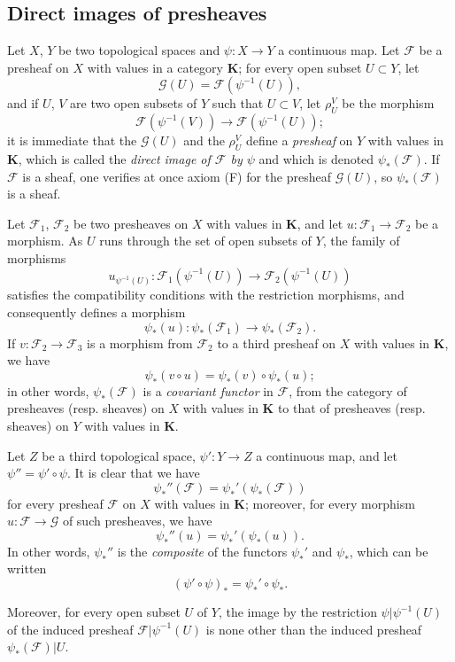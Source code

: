 \subsection{Direct images of presheaves}
\label{subsection:0.3.4}

\begin{env}[3.4.1]
\label{0.3.4.1}
Let $X$, $Y$ be two topological spaces and $\psi:X\to Y$ a continuous
map. Let $\mathcal{F}$ be a presheaf on $X$ with values in a
category $\mathbf{K}$; for every open subset $U\subset Y$, let
\[
  \mathcal{G}(U)=\mathcal{F}(\psi^{-1}(U)),
\]
and if $U$, $V$ are two open subsets of $Y$ such that $U\subset V$, let
$\rho_U^V$ be the morphism
\[
  \mathcal{F}(\psi^{-1}(V))\to\mathcal{F}(\psi^{-1}(U));
\]
it is immediate that the $\mathcal{G}(U)$ and the $\rho_U^V$ define a
\emph{presheaf} on $Y$ with values in $\mathbf{K}$, which is called
the \emph{direct image of $\mathcal{F}$ by $\psi$} and which is denoted
$\psi_*(\mathcal{F})$. If $\mathcal{F}$ is a sheaf, one verifies at once
axiom (F) for the presheaf $\mathcal{G}(U)$, so
$\psi_*(\mathcal{F})$ is a sheaf.
\end{env}

\begin{env}[3.4.2]
\label{0.3.4.2}
Let $\mathcal{F}_1$, $\mathcal{F}_2$ be two presheaves on $X$ with values
in $\mathbf{K}$, and let $u:\mathcal{F}_1\to\mathcal{F}_2$ be a morphism.
As $U$ runs through the set of open subsets of $Y$, the family of
morphisms
\[
  u_{\psi^{-1}(U)}:
  \mathcal{F}_1(\psi^{-1}(U))\to\mathcal{F}_2(\psi^{-1}(U))
\]
satisfies the compatibility conditions with the restriction morphisms,
and consequently defines a morphism
\[
  \psi_*(u):\psi_*(\mathcal{F}_1)\to\psi_*(\mathcal{F}_2).
\]
If $v:\mathcal{F}_2\to\mathcal{F}_3$ is a morphism from $\mathcal{F}_2$ to
a third presheaf on $X$ with values in $\mathbf{K}$, we have
\[
  \psi_*(v\circ u)=\psi_*(v)\circ\psi_*(u);
\]
in other words, $\psi_*(\mathcal{F})$ is a \emph{covariant functor} in
$\mathcal{F}$, from the category of presheaves (resp. sheaves) on $X$ with
values in $\mathbf{K}$ to that of presheaves (resp. sheaves) on
$Y$ with values in $\mathbf{K}$.
\end{env}

\begin{env}[3.4.3]
\label{0.3.4.3}
Let $Z$ be a third topological space, $\psi':Y\to Z$ a continuous
map, and let $\psi''=\psi'\circ\psi$. It is clear that we have
\[
  \psi_*''(\mathcal{F})=\psi_*'(\psi_*(\mathcal{F}))
\]
for every presheaf $\mathcal{F}$ on $X$ with values in $\mathbf{K}$;
moreover, for every morphism $u:\mathcal{F}\to\mathcal{G}$ of such presheaves,
we have
\[
  \psi_*''(u)=\psi_*'(\psi_*(u)).
\]
In other words, $\psi_*''$ is the \emph{composite} of the functors $\psi_*'$
and $\psi_*$, which can be written
\[
  (\psi'\circ\psi)_*=\psi_*'\circ\psi_*.
\]

Moreover, for every open subset $U$ of $Y$, the image by the restriction
$\psi|\psi^{-1}(U)$ of the induced presheaf
$\mathcal{F}|\psi^{-1}(U)$ is none other than the induced presheaf
$\psi_*(\mathcal{F})|U$.
\end{env}

